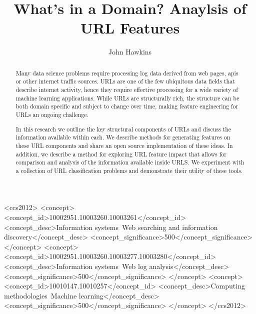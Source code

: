 \documentclass[sigconf]{acmart}
\begin{document}
\title{What's in a Domain? Anaylsis of URL Features}

\author{John Hawkins}

\renewcommand{\shortauthors}{Hawkins}

\begin{abstract}
Many data science problems require processing log data derived from web pages, apis or other
internet traffic sources. URLs are one of the few ubiquitous data fields that describe
internet activity, hence they require effective processing for a wide variety of machine 
learning applications. While URLs are structurally rich, the structure can be both domain specific
and subject to change over time, making feature engineering for URLs an ongoing challenge.

In this research we outline the key structural components of URLs and discuss the information
available within each. We describe methods for generating features on these URL components and 
share an open source implementation of these ideas. In addition, we describe a method for 
exploring URL feature impact that allows for comparison and analysis of the information available inside URLS.
We experiment with a collection of URL classification problems and demonstrate their utility 
of these tools. 
\end{abstract}


\begin{CCSXML}
<ccs2012>
<concept>
<concept_id>10002951.10003260.10003261</concept_id>
<concept_desc>Information systems~Web searching and information discovery</concept_desc>
<concept_significance>500</concept_significance>
</concept>
<concept>
<concept_id>10002951.10003260.10003277.10003280</concept_id>
<concept_desc>Information systems~Web log analysis</concept_desc>
<concept_significance>500</concept_significance>
</concept>
<concept>
<concept_id>10010147.10010257</concept_id>
<concept_desc>Computing methodologies~Machine learning</concept_desc>
<concept_significance>500</concept_significance>
</concept>
</ccs2012>
\end{CCSXML}
\end{document}
